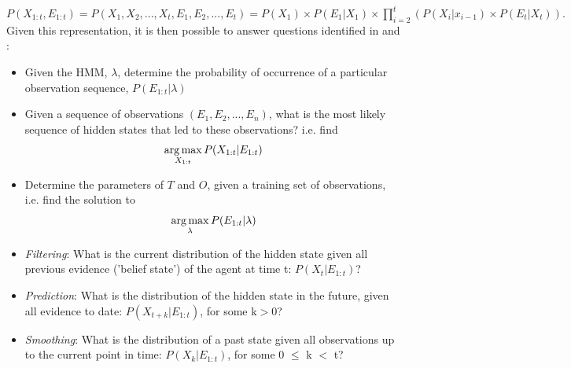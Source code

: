 $
P(X_{1:t}, E_{1:t}) = P(X_1, X_2, ..., X_t, E_1, E_2, ..., E_t) = P(X_1) \times P(E_1 | X_1) \times
\prod_{i=2}^{t}{(P(X_i | x_{i-1}) \times P(E_t | X_t))}.
$Given this representation, it is then possible to answer questions identified in \cite{Rabiner1989ARecognition} and \cite{Murphy1994DynamicLearning}:
\begin{itemize}

    \item Given the HMM, $\lambda$, determine the probability of occurrence of a particular observation sequence, $P(E_{1:t} | \lambda)$
    
    \item Given a sequence of observations $(E_1, E_2, ..., E_n)$, what is the most likely sequence of hidden states that led to these observations? i.e. find \[\operatorname*{arg\,max}_{X_{1:t}} P(X_{1:t} | E_{1:t})\]
    
    \item Determine the parameters of $T$ and $O$, given a training set of observations, i.e. find the solution to \[\operatorname*{arg\,max}_{\lambda} P(E_{1:t} | \lambda)\]
    
    \item \textit{Filtering}: What is the current distribution of the hidden state given all previous evidence ('belief state') of the agent at time t: $P(X_t | E_{1:t})$?
    
    \item \textit{Prediction}: What is the distribution of the hidden state in the future, given all evidence to date: $P(X_{t+k} | E_{1:t})$, for some k$>$0?
    
    \item \textit{Smoothing}: What is the distribution of a past state given all observations up to the current point in time: $P(X_k | E_{1:t})$, for some 0 $\leq$ k $<$ t?
    
\end{itemize}
\par


